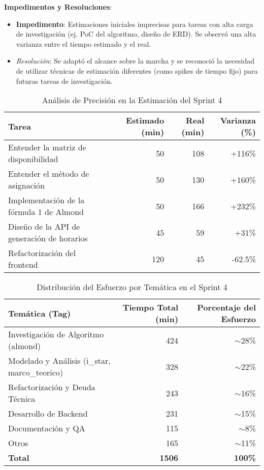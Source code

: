 \textbf{Impedimentos y Resoluciones}:
\begin{itemize}
    \item \textbf{Impedimento}: Estimaciones iniciales imprecisas para tareas con alta carga de investigación (ej. PoC del algoritmo, diseño de ERD). Se observó una alta varianza entre el tiempo estimado y el real.
    \item \textit{Resolución}: Se adaptó el alcance sobre la marcha y se reconoció la necesidad de utilizar técnicas de estimación diferentes (como spikes de tiempo fijo) para futuras tareas de investigación.
\end{itemize}

\begin{table}[H]
    \caption{Análisis de Precisión en la Estimación del Sprint 4}
    \label{tab:sprint-4-estimation-accuracy}
    \begin{tabularx}{\textwidth}{@{}Xrrr@{}}
        \toprule
        \textbf{Tarea} & \textbf{Estimado (min)} & \textbf{Real (min)} & \textbf{Varianza (\%)} \\
        \midrule
        Entender la matriz de disponibilidad & 50 & 108 & +116\% \\
        Entender el método de asignación & 50 & 130 & +160\% \\
        Implementación de la fórmula 1 de Almond & 50 & 166 & +232\% \\
        Diseño de la API de generación de horarios & 45 & 59 & +31\% \\
        Refactorización del frontend & 120 & 45 & -62.5\% \\
        \bottomrule
    \end{tabularx}
\end{table}

\begin{table}[H]
    \caption{Distribución del Esfuerzo por Temática en el Sprint 4}
    \label{tab:sprint-4-effort-distribution}
    \begin{tabularx}{\textwidth}{@{}Xrr@{}}
        \toprule
        \textbf{Temática (Tag)} & \textbf{Tiempo Total (min)} & \textbf{Porcentaje del Esfuerzo} \\
        \midrule
        Investigación de Algoritmo (almond) & 424 & $\sim$28\% \\
        Modelado y Análisis (i\_star, marco\_teorico) & 328 & $\sim$22\% \\
        Refactorización y Deuda Técnica & 243 & $\sim$16\% \\
        Desarrollo de Backend & 231 & $\sim$15\% \\
        Documentación y QA & 115 & $\sim$8\% \\
        Otros & 165 & $\sim$11\% \\
        \midrule
        \textbf{Total} & \textbf{1506} & \textbf{100\%} \\
        \bottomrule
    \end{tabularx}
\end{table}

